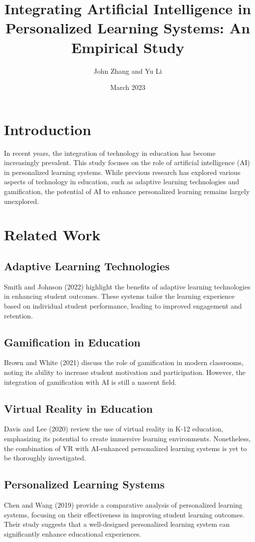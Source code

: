 \documentclass{article}
\title{Integrating Artificial Intelligence in Personalized Learning Systems: An Empirical Study}
\author{John Zhang and Yu Li}
\date{March 2023}
\begin{document}
\maketitle

\section{Introduction}
In recent years, the integration of technology in education has become increasingly prevalent. This study focuses on the role of artificial intelligence (AI) in personalized learning systems. While previous research has explored various aspects of technology in education, such as adaptive learning technologies and gamification, the potential of AI to enhance personalized learning remains largely unexplored.

\section{Related Work}
\subsection{Adaptive Learning Technologies}
Smith and Johnson (2022) highlight the benefits of adaptive learning technologies in enhancing student outcomes. These systems tailor the learning experience based on individual student performance, leading to improved engagement and retention.

\subsection{Gamification in Education}
Brown and White (2021) discuss the role of gamification in modern classrooms, noting its ability to increase student motivation and participation. However, the integration of gamification with AI is still a nascent field.

\subsection{Virtual Reality in Education}
Davis and Lee (2020) review the use of virtual reality in K-12 education, emphasizing its potential to create immersive learning environments. Nonetheless, the combination of VR with AI-enhanced personalized learning systems is yet to be thoroughly investigated.

\subsection{Personalized Learning Systems}
Chen and Wang (2019) provide a comparative analysis of personalized learning systems, focusing on their effectiveness in improving student learning outcomes. Their study suggests that a well-designed personalized learning system can significantly enhance educational experiences.
\end{document}
